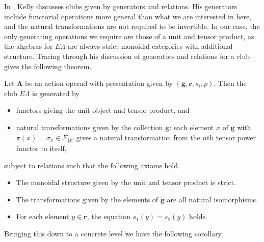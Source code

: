 \documentclass{amsbook} %
\newcommand{\mb}{\mathbf}
\numberwithin{section}{chapter}
\begin{document}
In \cite{kelly_club1}, Kelly discusses clubs given by generators and relations.  His generators include functorial operations more general than what we are interested in here, and the natural transformations are not required to be invertible.  In our case, the only generating operations we require are those of a unit and tensor product, as the algebras for $E\Lambda$ are always strict monoidal categories with additional structure.  Tracing through his discussion of generators and relations for a club gives the following theorem.

\begin{thm}\label{pres1}
Let $\mb{\Lambda}$ be an action operad with presentation given by $(\mathbf{g},\mathbf{r}, s_{i}, p)$.  Then the club $E\Lambda$ is generated by
\begin{itemize}
  \item functors giving the unit object and tensor product, and
  \item natural transformations given by the collection $\mathbf{g}$:  each element $x$ of $\mathbf{g}$ with $\pi(x) = \sigma_{x} \in \Sigma_{|x|}$ gives a natural transformation from the $n$th tensor power functor to itself,
\end{itemize}
subject to relations such that the following axioms hold.
\begin{itemize}
  \item The monoidal structure given by the unit and tensor product is strict.
  \item The transformations given by the elements of $\mathbf{g}$ are all natural isomorphisms.
  \item For each element $y \in \mathbf{r}$, the equation $s_{1}(y) = s_{2}(y)$ holds.
\end{itemize}
\end{thm}

Bringing this down to a concrete level we have the following corollary.
\end{document}
